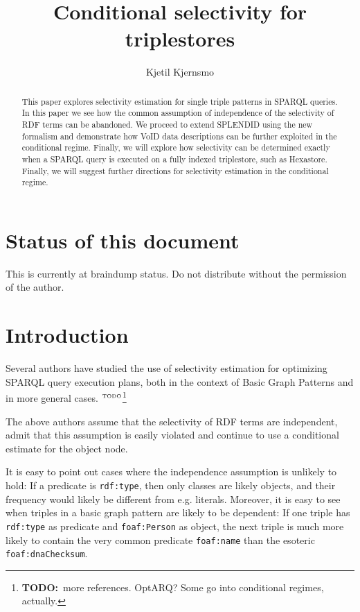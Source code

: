 \documentclass[12pt, draft]{article}
\title{Conditional selectivity for triplestores}
\author{Kjetil Kjernsmo}
\newcommand{\rdfterm}[1]{\texttt{#1}}
\newcommand{\todo}[1]{\ensuremath{^{\textrm{\tiny{TODO}\normalsize}}}\footnote{\textbf{TODO:}~#1}}
\begin{document}
\maketitle

\section*{Status of this document}

This is currently at braindump status. Do not distribute without the
permission of the author.

\begin{abstract}
  This paper explores selectivity estimation for single triple
  patterns in SPARQL queries. In this paper we see how the common
  assumption of independence of the selectivity of RDF terms can be
  abandoned. We proceed to extend SPLENDID\cite{splendid} using the
  new formalism and demonstrate how VoID data descriptions\cite{void} can be
  further exploited in the conditional regime. Finally, we will
  explore how selectivity can be determined exactly when a SPARQL
  query is executed on a fully indexed triplestore, such as
  Hexastore\cite{Weiss:2008:HSI:1453856.1453965}. Finally, we will
  suggest further directions for selectivity estimation in the
  conditional regime.

\end{abstract}

\section{Introduction}

Several authors have studied the use of selectivity estimation for
optimizing SPARQL query execution plans, both in the context of Basic
Graph Patterns \cite{Stocker:2008:SBG:1367497.1367578} and in more
general cases. \todo{more references. OptARQ? Some go into conditional
regimes, actually.}

The above authors assume that the selectivity of RDF terms are
independent, admit that this assumption is easily violated and
continue to use a conditional estimate for the object node.

It is easy to point out cases where the independence assumption is
unlikely to hold: If a predicate is \rdfterm{rdf:type}, then only
classes are likely objects, and their frequency would likely be
different from e.g. literals. Moreover, it is easy to see when triples
in a basic graph pattern are likely to be dependent: If one triple has
\rdfterm{rdf:type} as predicate and \rdfterm{foaf:Person} as object,
the next triple is much more likely to contain the very
common predicate \rdfterm{foaf:name} than the esoteric
\rdfterm{foaf:dnaChecksum}.
\end{document}
